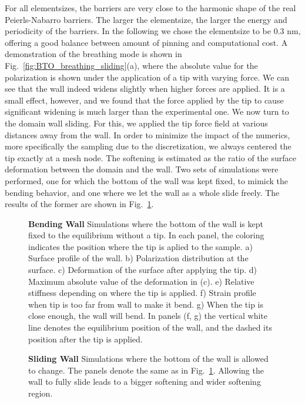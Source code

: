 For all elementsizes, the barriers are very close to the harmonic shape of the real Peierls-Nabarro barriers. The larger the elementsize, the larger the energy and periodicity of the barriers.
In the following we chose the elementsize to be 0.3 nm, offering a good balance between amount of pinning and computational cost. 
A demonstration of the breathing mode is shown in Fig.~\ref{fig:BTO_breathing_sliding}(a), where the absolute value for the polarization is shown under the application of a tip with varying force.
We can see that the wall indeed widens slightly when higher forces are applied. It is a small effect, however, and we found that the force applied by the tip to cause significant widening is much larger than the experimental one.
We now turn to the domain wall sliding.
For this, we applied the tip force field at various distances away from the wall. In order to minimize the impact of the numerics, more specifically the sampling due to the discretization, we always centered the tip exactly at a mesh node.
The softening is estimated as the ratio of the surface deformation between the domain and the wall.
Two sets of simulations were performed, one for which the bottom of the wall was kept fixed, to mimick the bending behavior, and one where we let the wall as a whole slide freely.
The results of the former are shown in Fig.~\ref{fig:BTO_bending_sim}.
\begin{figure}[h!]
	\caption{\label{fig:BTO_bending_sim}{\bf Bending Wall} Simulations where the bottom of the wall is kept fixed to the equilibrium without a tip. In each panel, the coloring indicates the position where the tip is aplied to the sample. a) Surface profile of the wall. b) Polarization distribution at the surface. c) Deformation of the surface after applying the tip. d) Maximum absolute value of the deformation in (c). e) Relative stiffness depending on where the tip is applied. f) Strain profile when tip is too far from wall to make it bend. g) When the tip is close enough, the wall will bend. In panels (f, g) the vertical white line denotes the equilibrium position of the wall, and the dashed its position after the tip is applied.}
\end{figure}
\begin{figure}[h!]
	\caption{\label{fig:BTO_sliding_sim}{\bf Sliding Wall} Simulations where the bottom of the wall is allowed to change. The panels denote the same as in Fig.~\ref{fig:BTO_bending_sim}. Allowing the wall to fully slide leads to a bigger softening and wider softening region.}
\end{figure}
